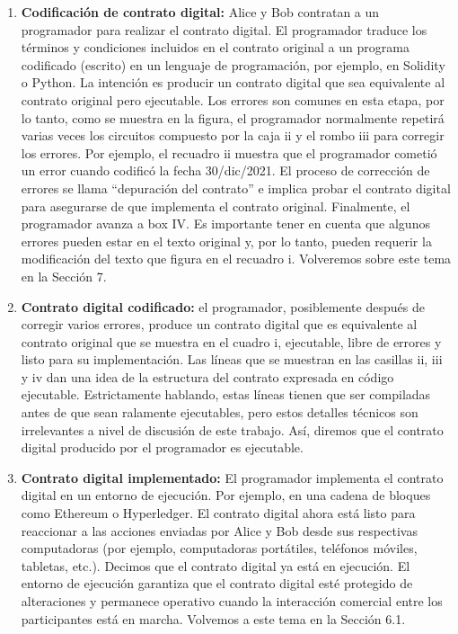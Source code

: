 \documentclass[12pt]{report} %
\begin{document}
\begin{itemize}
\begin{enumerate}
    
    \item \textbf{ Codificación de contrato digital:} Alice y Bob contratan a un programador para realizar el contrato digital. El programador traduce los términos y condiciones incluidos en el contrato original a un programa codificado (escrito) en un lenguaje de programación, por ejemplo, en Solidity o Python. La intención es producir un contrato digital que sea equivalente al contrato original pero ejecutable. Los errores son comunes en esta etapa, por lo tanto, como se muestra en la figura, el programador normalmente repetirá varias veces los circuitos compuesto por la caja ii y el rombo iii para corregir los errores. Por ejemplo, el recuadro ii muestra que el programador cometió un error cuando codificó la fecha 30/dic/2021. El proceso de corrección de errores se llama “depuración del contrato” e implica probar el contrato digital para asegurarse de que implementa el contrato original. Finalmente, el programador avanza a box IV. Es importante tener en cuenta que algunos errores pueden estar en el texto original y, por lo tanto, pueden requerir la modificación del texto que figura en el recuadro i. Volveremos sobre este tema en la Sección 7.

    
    \item \textbf{ Contrato digital codificado:} el programador, posiblemente después de corregir varios errores, produce un contrato digital que es equivalente al contrato original que se muestra en el cuadro i, ejecutable, libre de errores y listo para su implementación. Las líneas que se muestran en las casillas ii, iii y iv dan una idea de la estructura del contrato expresada en código ejecutable. Estrictamente hablando, estas líneas tienen que ser compiladas antes de que sean ralamente ejecutables, pero estos detalles técnicos son irrelevantes a nivel de discusión de este trabajo. Así, diremos que el contrato digital producido por el programador es ejecutable.


\item \textbf {Contrato digital implementado:} El programador implementa el contrato digital en un entorno de ejecución. Por ejemplo, en una cadena de bloques como Ethereum o Hyperledger. El contrato digital ahora está listo para reaccionar a las acciones enviadas por Alice y Bob desde sus respectivas computadoras (por ejemplo, computadoras portátiles, teléfonos móviles, tabletas, etc.). Decimos que el contrato digital ya está en ejecución. El entorno de ejecución garantiza que el contrato digital esté protegido de alteraciones y permanece operativo cuando la interacción comercial entre los participantes está en marcha. Volvemos a este tema en la Sección 6.1.



\end{enumerate}
\end{itemize}
\end{document}
